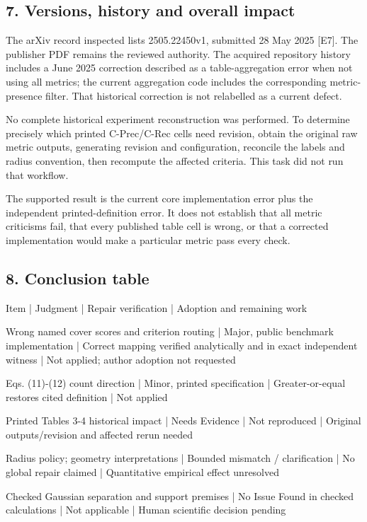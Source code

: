 \documentclass[10pt]{article}
\begin{document}
\subsection*{7. Versions, history and overall impact}
The arXiv record inspected lists 2505.22450v1, submitted 28 May 2025 [E7]. The publisher PDF remains the reviewed authority. The acquired repository history includes a June 2025 correction described as a table-aggregation error when not using all metrics; the current aggregation code includes the corresponding metric-presence filter. That historical correction is not relabelled as a current defect.\par
No complete historical experiment reconstruction was performed. To determine precisely which printed C-Prec/C-Rec cells need revision, obtain the original raw metric outputs, generating revision and configuration, reconcile the labels and radius convention, then recompute the affected criteria. This task did not run that workflow.\par
The supported result is the current core implementation error plus the independent printed-definition error. It does not establish that all metric criticisms fail, that every published table cell is wrong, or that a corrected implementation would make a particular metric pass every check.\par
\subsection*{8. Conclusion table}
Item | Judgment | Repair verification | Adoption and remaining work\par
Wrong named cover scores and criterion routing | Major, public benchmark implementation | Correct mapping verified analytically and in exact independent witness | Not applied; author adoption not requested\par
Eqs. (11)-(12) count direction | Minor, printed specification | Greater-or-equal restores cited definition | Not applied\par
Printed Tables 3-4 historical impact | Needs Evidence | Not reproduced | Original outputs/revision and affected rerun needed\par
Radius policy; geometry interpretations | Bounded mismatch / clarification | No global repair claimed | Quantitative empirical effect unresolved\par
Checked Gaussian separation and support premises | No Issue Found in checked calculations | Not applicable | Human scientific decision pending\par
\end{document}
